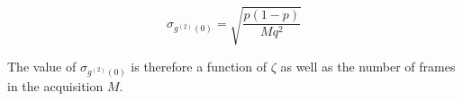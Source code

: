 \begin{equation}
\sigma_{g^{(2)}(0)}=\sqrt{\frac{p(1-p)}{M q^{2}}}
\end{equation}

The value of $\sigma_{g^{(2)}(0)}$ is therefore a function of $\zeta$ as well as the number of frames in the acquisition $M$. 











